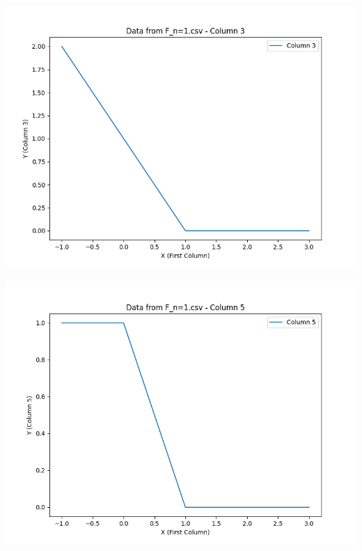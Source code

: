 \documentclass[UTF8]{ctexart}
\begin{document}
\noindent %
\begin{minipage}{0.3\textwidth}
	\includegraphics[width=\linewidth]{../figure/F_n=1.csv_Column_3.png} %
\end{minipage}
\hspace{1em} %
\begin{minipage}{0.3\textwidth}
	\includegraphics[width=\linewidth]{../figure/F_n=1.csv_Column_5.png} %
\end{minipage}

\vspace{0.5em} %
\end{document}
